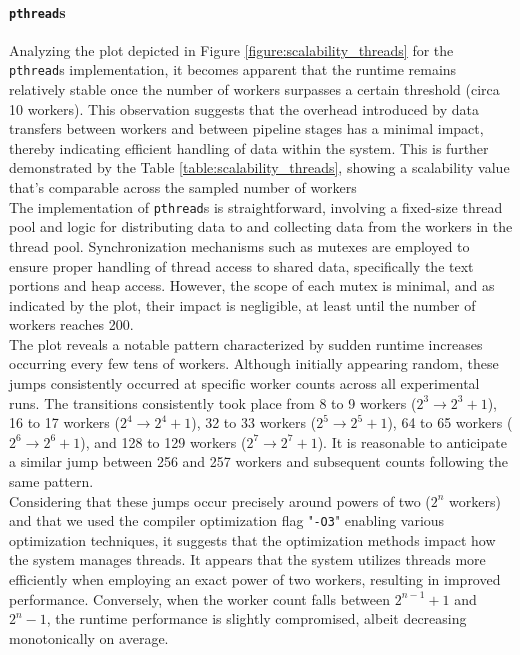 \documentclass[10pt]{article}
\begin{document}
\paragraph{\texttt{pthread}s} Analyzing the plot depicted in Figure \ref{figure:scalability_threads} for the \texttt{pthread}s implementation, it becomes apparent that the runtime remains relatively stable once the number of workers surpasses a certain threshold (circa 10 workers). This observation suggests that the overhead introduced by data transfers between workers and between pipeline stages has a minimal impact, thereby indicating efficient handling of data within the system. This is further demonstrated by the Table \ref{table:scalability_threads}, showing a scalability value that's comparable across the sampled number of workers\\
The implementation of \texttt{pthread}s is straightforward, involving a fixed-size thread pool and logic for distributing data to and collecting data from the workers in the thread pool. Synchronization mechanisms such as mutexes are employed to ensure proper handling of thread access to shared data, specifically the text portions and heap access. However, the scope of each mutex is minimal, and as indicated by the plot, their impact is negligible, at least until the number of workers reaches 200.\\
The plot reveals a notable pattern characterized by sudden runtime increases occurring every few tens of workers. Although initially appearing random, these jumps consistently occurred at specific worker counts across all experimental runs. The transitions consistently took place from 8 to 9 workers ($2^3 \rightarrow 2^3 + 1$), 16 to 17 workers ($2^4 \rightarrow 2^4 + 1$), 32 to 33 workers ($2^5 \rightarrow 2^5 + 1$), 64 to 65 workers ($2^6 \rightarrow 2^6 + 1$), and 128 to 129 workers ($2^7 \rightarrow 2^7 + 1$). It is reasonable to anticipate a similar jump between 256 and 257 workers and subsequent counts following the same pattern.\\
Considering that these jumps occur precisely around powers of two ($2^n$ workers) and that we used the compiler optimization flag "\texttt{-O3}" enabling various optimization techniques, it suggests that the optimization methods impact how the system manages threads. It appears that the system utilizes threads more efficiently when employing an exact power of two workers, resulting in improved performance. Conversely, when the worker count falls between $2^{n-1} + 1$ and $2^n - 1$, the runtime performance is slightly compromised, albeit decreasing monotonically on average.\\
\end{document}
